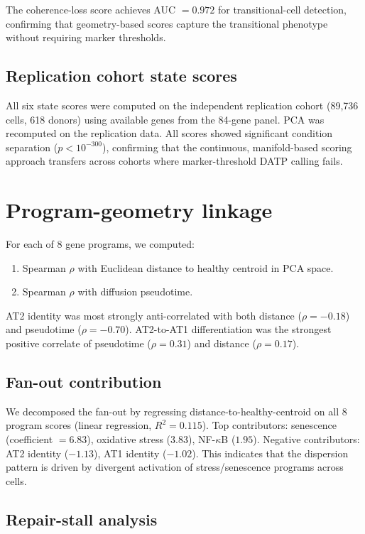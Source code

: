 \documentclass[11pt]{article}
\begin{document}
The coherence-loss score achieves AUC $= 0.972$ for transitional-cell detection, confirming that geometry-based scores capture the transitional phenotype without requiring marker thresholds.

\subsection{Replication cohort state scores}

All six state scores were computed on the independent replication cohort (89,736 cells, 618 donors) using available genes from the 84-gene panel. PCA was recomputed on the replication data. All scores showed significant condition separation ($p < 10^{-300}$), confirming that the continuous, manifold-based scoring approach transfers across cohorts where marker-threshold DATP calling fails.

\section{Program-geometry linkage}

For each of 8 gene programs, we computed:
\begin{enumerate}
    \item Spearman $\rho$ with Euclidean distance to healthy centroid in PCA space.
    \item Spearman $\rho$ with diffusion pseudotime.
\end{enumerate}

AT2 identity was most strongly anti-correlated with both distance ($\rho = -0.18$) and pseudotime ($\rho = -0.70$). AT2-to-AT1 differentiation was the strongest positive correlate of pseudotime ($\rho = 0.31$) and distance ($\rho = 0.17$).

\subsection{Fan-out contribution}

We decomposed the fan-out by regressing distance-to-healthy-centroid on all 8 program scores (linear regression, $R^2 = 0.115$). Top contributors: senescence (coefficient $= 6.83$), oxidative stress ($3.83$), NF-$\kappa$B ($1.95$). Negative contributors: AT2 identity ($-1.13$), AT1 identity ($-1.02$). This indicates that the dispersion pattern is driven by divergent activation of stress/senescence programs across cells.

\subsection{Repair-stall analysis}
\end{document}
